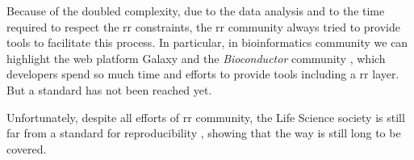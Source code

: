 Because of the doubled complexity, due to the data analysis and to the time required to respect the \gls{rr} constraints, the \gls{rr} community always tried to provide tools to facilitate this process.
In particular, in bioinformatics community we can highlight the web platform Galaxy \cite{Aranguren2015, Goecks2010a} and the \textit{Bioconductor} community \cite{Gentleman2004, Shepherd2018}, which developers spend so much time and efforts to provide tools including a \gls{rr} layer.
But a standard has not been reached yet.

Unfortunately, despite all efforts of \gls{rr} community, the Life Science society is still far from a standard for reproducibility \cite{Iqbal2016}, showing that the way is still long to be covered.


